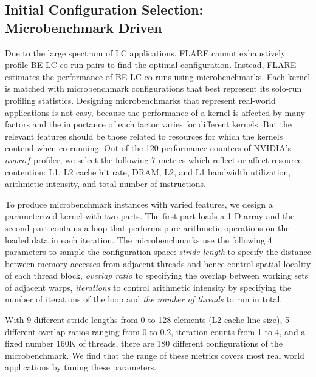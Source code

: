 \subsection{Initial Configuration Selection:
				Microbenchmark Driven}
				\label{sec:initial}
		Due to the large spectrum of LC applications, FLARE cannot exhaustively profile BE-LC co-run pairs to find the optimal configuration. Instead, FLARE estimates the performance of BE-LC co-runs using microbenchmarks. Each kernel is matched with microbenchmark configurations that best represent its solo-run profiling statistics. Designing microbenchmarks  that represent real-world applications is not easy, because the performance of a kernel is affected by many factors and the importance of each factor varies for different kernels. But the relevant features should be those related to resources for which the kernels contend when co-running. Out of the 120 performance counters of NVIDIA's $nvprof$ profiler, we select the following 7 metrics which reflect or affect resource contention:
			L1, L2 cache hit rate,
			DRAM, L2, and L1 bandwidth utilization,
			arithmetic intensity, 
			and total number of instructions. 
        
		To produce microbenchmark instances with varied features, we design a parameterized 
        kernel with two parts. The first part loads a 1-D array and the second part 
        contains a loop that performs pure arithmetic operations on the loaded data in each iteration. 
        The microbenchmarks use the following 4 parameters to sample the configuration space: {\em stride length} to specify the distance between memory accesses from adjacent threads and hence control spatial locality of each thread block, {\em overlap ratio} to specifying the overlap between working sets of adjacent warps, {\em iterations} to control arithmetic intensity by specifying the number of iterations of the loop and {\em the number of threads} to run in total.
		
	    With 9 different stride lengths from 0 to 128 elements (L2 cache line size), 5 different overlap ratios ranging from 0 to 0.2, 
        iteration counts from 1 to 4, and a fixed number 160K of threads, 
        there are 180 different configurations of the microbenchmark. 
        We find that the range of these metrics covers most real world applications by tuning these parameters.
     

